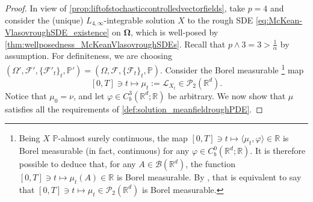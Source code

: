\documentclass[10pt, a4paper]{article} %
\newcommand{\R}{\mathbb{R}}
\theoremstyle{definition}
\theoremstyle{plain}
\begin{document}
\begin{proof}
    In view of \cref{prop:liftofstochasticcontrolledvectorfields}, take $p=4$ and consider the (unique) $L_{4,\infty}$-integrable solution $X$ to the rough SDE \eqref{eq:McKean-VlasovroughSDE_existence} on $\mathbf{\Omega}$, which is well-posed by \cref{thm:wellposedness_McKeanVlasovroughSDEs}.    
    Recall that $p \wedge 3 = 3 > \frac{1}{\alpha}$ by assumption. 
     For definiteness, we are choosing $(\Omega',\mathcal{F}', \{\mathcal{F}'_t\}_t, \mathbb{P}') = (\Omega, \mathcal{F},\{\mathcal{F}_t\}_t, \mathbb{P})$.
    Consider the Borel measurable \footnote{Being $X$ $\mathbb{P}$-almost surely continuous, the map $[0,T] \ni t \mapsto \langle \mu_t , \varphi \rangle \in \R$ is Borel measurable (in fact, continuous) for any $\varphi \in C^0_b(\R^d;\R)$. It is therefore possible to deduce that, for any $A \in \mathcal{B}(\R^d)$, the function $[0,T] \ni t \mapsto \mu_t(A) \in \R$ is Borel measurable. By \cite[Proposition 5.7]{CARMONADELARUE_volumeI}, that is equivalent to say that $[0,T] \ni t \mapsto \mu_t \in \mathcal{P}_2(\R^d)$ is Borel measurable.} map \begin{equation} \label{eq:definitionofmu}
        [0,T] \ni t \mapsto  \mu_t := \mathcal{L}_{X_t} \in \mathcal{P}_2(\R^d).
    \end{equation} 
    Notice that $\mu_0 = \nu$, and let $\varphi \in C_b^3(\R^d;\R)$ be arbitrary. We now show that $\mu$ satisfies all the requirements of \cref{def:solution_meanfieldroughPDE}.

\end{proof}
\end{document}
